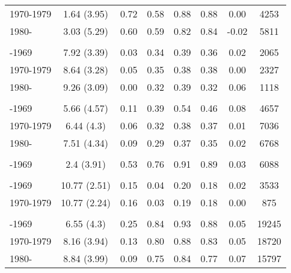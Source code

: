 \begin{ThreePartTable}
\begin{longtable}[t]{lccccccc}
\hspace{1em}1970-1979 & 1.64 (3.95) & 0.72 & 0.58 & 0.88 & 0.88 & 0.00 & 4253\\
\hspace{1em}1980- & 3.03 (5.29) & 0.60 & 0.59 & 0.82 & 0.84 & -0.02 & 5811\\
\addlinespace[0.3em]
\multicolumn{8}{l}{\textbf{Guyana}}\\
\hspace{1em}-1969 & 7.92 (3.39) & 0.03 & 0.34 & 0.39 & 0.36 & 0.02 & 2065\\
\hspace{1em}1970-1979 & 8.64 (3.28) & 0.05 & 0.35 & 0.38 & 0.38 & 0.00 & 2327\\
\hspace{1em}1980- & 9.26 (3.09) & 0.00 & 0.32 & 0.39 & 0.32 & 0.06 & 1118\\
\addlinespace[0.3em]
\multicolumn{8}{l}{\textbf{Honduras}}\\
\hspace{1em}-1969 & 5.66 (4.57) & 0.11 & 0.39 & 0.54 & 0.46 & 0.08 & 4657\\
\hspace{1em}1970-1979 & 6.44 (4.3) & 0.06 & 0.32 & 0.38 & 0.37 & 0.01 & 7036\\
\hspace{1em}1980- & 7.51 (4.34) & 0.09 & 0.29 & 0.37 & 0.35 & 0.02 & 6768\\
\addlinespace[0.3em]
\multicolumn{8}{l}{\textbf{Ivory Coast}}\\
\hspace{1em}-1969 & 2.4 (3.91) & 0.53 & 0.76 & 0.91 & 0.89 & 0.03 & 6088\\
\addlinespace[0.3em]
\multicolumn{8}{l}{\textbf{Kazakhstan}}\\
\hspace{1em}-1969 & 10.77 (2.51) & 0.15 & 0.04 & 0.20 & 0.18 & 0.02 & 3533\\
\hspace{1em}1970-1979 & 10.77 (2.24) & 0.16 & 0.03 & 0.19 & 0.18 & 0.00 & 875\\
\addlinespace[0.3em]
\multicolumn{8}{l}{\textbf{Kenya}}\\
\hspace{1em}-1969 & 6.55 (4.3) & 0.25 & 0.84 & 0.93 & 0.88 & 0.05 & 19245\\
\hspace{1em}1970-1979 & 8.16 (3.94) & 0.13 & 0.80 & 0.88 & 0.83 & 0.05 & 18720\\
\hspace{1em}1980- & 8.84 (3.99) & 0.09 & 0.75 & 0.84 & 0.77 & 0.07 & 15797\\

\end{longtable}
\end{ThreePartTable}
